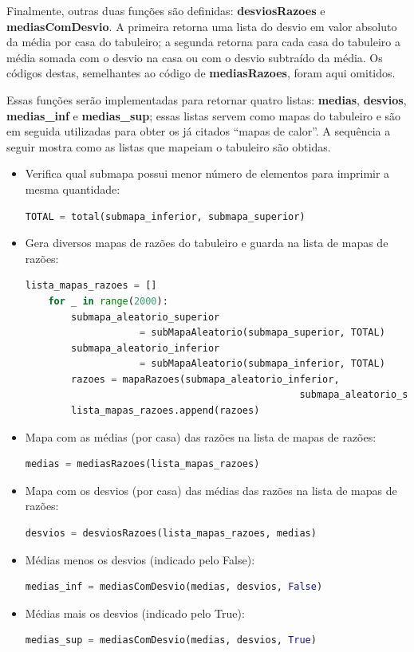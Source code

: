 \documentclass[12pt]{article}
\newcommand{\aspas}[1]{``#1''} %
\begin{document}
Finalmente, outras duas funções são definidas: \textbf{desviosRazoes} e \textbf{mediasComDesvio}. A primeira retorna uma lista do desvio em valor absoluto da média por casa do tabuleiro; a segunda retorna para cada casa do tabuleiro a média somada com o desvio na casa ou com o desvio subtraído da média. Os códigos destas, semelhantes ao código de \textbf{mediasRazoes}, foram aqui omitidos.

Essas funções serão implementadas para retornar quatro listas: \textbf{medias}, \textbf{desvios}, \textbf{medias\_inf} e \textbf{medias\_sup}; essas listas servem como mapas do tabuleiro e são em seguida utilizadas para obter os já citados \aspas{mapas de calor}. A sequência a seguir mostra como as listas que mapeiam o tabuleiro são obtidas.

\begin{itemize}
	\item Verifica qual submapa possui menor número de elementos para imprimir a mesma quantidade:
	\begin{lstlisting}[language=Python]
	TOTAL = total(submapa_inferior, submapa_superior)
	\end{lstlisting}
	
	\item Gera diversos mapas de razões do tabuleiro e guarda na lista de mapas de razões:
	\begin{lstlisting}[language=Python]
	lista_mapas_razoes = []
	for _ in range(2000):
		submapa_aleatorio_superior 
					= subMapaAleatorio(submapa_superior, TOTAL)
		submapa_aleatorio_inferior 
					= subMapaAleatorio(submapa_inferior, TOTAL)
		razoes = mapaRazoes(submapa_aleatorio_inferior, 
												submapa_aleatorio_superior)
		lista_mapas_razoes.append(razoes)
	\end{lstlisting}
	
	\item Mapa com as médias (por casa) das razões na lista de mapas de razões:
	\begin{lstlisting}[language=Python]
	medias = mediasRazoes(lista_mapas_razoes)
	\end{lstlisting}
	
	\item Mapa com os desvios (por casa) das médias das razões na lista de mapas de razões:
	\begin{lstlisting}[language=Python]
	desvios = desviosRazoes(lista_mapas_razoes, medias)
	\end{lstlisting}
	
	\item Médias menos os desvios (indicado pelo False):
	\begin{lstlisting}[language=Python]
	medias_inf = mediasComDesvio(medias, desvios, False)
	\end{lstlisting}
	
	\item Médias mais os desvios (indicado pelo True):
	\begin{lstlisting}[language=Python]
	medias_sup = mediasComDesvio(medias, desvios, True)
	\end{lstlisting}
\end{itemize}
\end{document}
